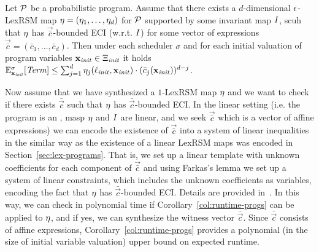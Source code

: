 \begin{corollary}
\label{col:runtime-progs}
Let $\mathcal{P}$ be a probabilistic program. Assume that there exists a 
$d$-dimensional $\epsilon$-LexRSM map $\mathbf{\eta}=(\eta_1,\dots,\eta_d)$ for 
$\mathcal{P}$ supported 
by some 
invariant map $I$, scuh that $\mathbf{\eta}$ has $\vec{\bar{c}}$-bounded ECI 
(w.r.t. $I$) 
for some vector of expressions $\vec{\bar{c}}=(\bar{c}_1,\dots,\bar{c}_d)$. 
Then under each scheduler $\sigma$ and for each initial valuation of program 
variables $\mathbf{x}_{\mathit{init}}\in\Xi_{\mathit{init}}$ it holds $\mathbb{E}^{\sigma}_{\mathbf{x}_{\mathit{init}}}[\mathit{Term}]\leq 
\sum_{j=1}^{d}\eta_j(\ell_{\mathit{init}},\mathbf{x}_{\mathit{init}})\cdot(\bar{c}_j(\mathbf{x}_{\mathit{init}}))^{d-j}$.
\end{corollary}

Now assume that we have synthesized a $1$-LexRSM map $\mathbf{\eta}$ and we want 
to check if there exists $\bar{\vec{c}}$ such that $\mathbf{\eta}$ has 
$\bar{\vec{c}}$-bounded ECI. In the linear setting (i.e. the program is an 
\APP{}, masp $\eta$ and $I$ are linear, and we seek $\vec{\bar{c}}$ which is 
a vector of affine expressions) we can encode the existence of $\vec{\bar{c}}$ 
into a system of linear inequalities in the similar way as the existence of a 
linear LexRSM maps was encoded in Section~\ref{sec:lex-programs}. That is, we 
set up a linear template with unknown coefficients for each component of 
$\vec{\bar{c}}$ and using Farkas's lemma we set up a system of linear 
constraints, which includes the unknown coefficients as variables, encoding the 
fact that $\mathbf{\eta}$ has $\bar{\vec{c}}$-bounded ECI. Details are provided 
in~\AppendixMaterial. In this way, we can check in polynomial time if 
Corollary~\ref{col:runtime-progs} can be applied to $\mathbf{\eta}$, and if yes, 
we can synthesize the witness vector $\bar{\vec{c}}$. Since $\bar{\vec{c}}$ 
consists of affine expressions, Corollary~\ref{col:runtime-progs} provides a 
polynomial (in the size of 
initial variable valuation) upper bound on expected runtime.


